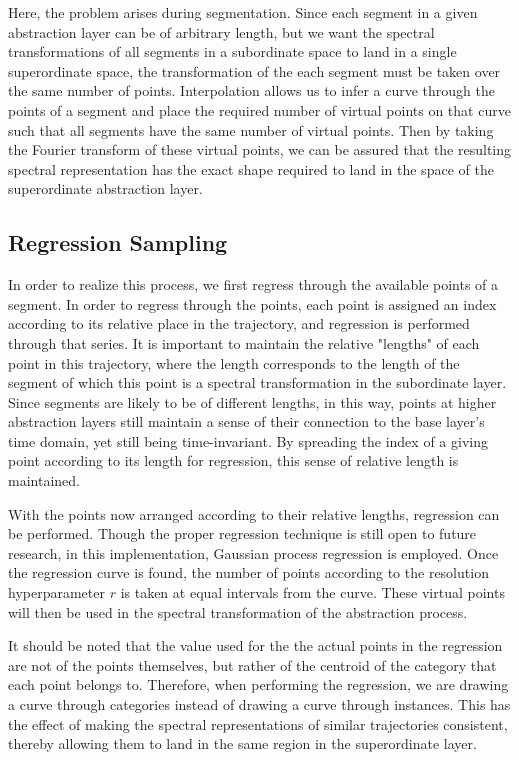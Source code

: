 Here, the problem arises during segmentation.  Since each segment in a given abstraction layer can be of arbitrary length, but we want the spectral transformations of all segments in a subordinate space to land in a single superordinate space, the transformation of the each segment must be taken over the same number of points.  Interpolation allows us to infer a curve through the points of a segment and place the required number of virtual points on that curve such that all segments have the same number of virtual points.  Then by taking the Fourier transform of these virtual points, we can be assured that the resulting spectral representation has the exact shape required to land in the space of the superordinate abstraction layer.

\subsection{Regression Sampling}
\label{section:regression-sampling}

In order to realize this process, we first regress through the available points of a segment.  In order to regress through the points, each point is assigned an index according to its relative place in the trajectory, and regression is performed through that series.  It is important to maintain the relative "lengths" of each point in this trajectory, where the length corresponds to the length of the segment of which this point is a spectral transformation in the subordinate layer.  Since segments are likely to be of different lengths, in this way, points at higher abstraction layers still maintain a sense of their connection to the base layer's time domain, yet still being time-invariant.  By spreading the index of a giving point according to its length for regression, this sense of relative length is maintained.

With the points now arranged according to their relative lengths, regression can be performed. Though the proper regression technique is still open to future research, in this implementation, Gaussian process regression \citep{williams1996gaussian} is employed.  Once the regression curve is found, the number of points according to the resolution hyperparameter $r$ is taken at equal intervals from the curve.  These virtual points will then be used in the spectral transformation of the abstraction process.

It should be noted that the value used for the the actual points in the regression are not of the points themselves, but rather of the centroid of the category that each point belongs to.  Therefore, when performing the regression, we are drawing a curve through categories instead of drawing a curve through instances.  This has the effect of making the spectral representations of similar trajectories consistent, thereby allowing them to land in the same region in the superordinate layer.

